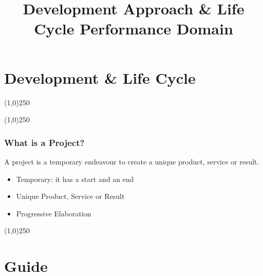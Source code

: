 



%
\title[Project Management \& BIM]{Development Approach \& Life Cycle Performance Domain}



%
\usetikzlibrary{arrows}



\newpage




\thispagestyle{empty}
\tableofcontents
\newpage
\section{Development \& Life Cycle}


\begin{frame}
\titlepage
\end{frame}\begin{center}\line(1,0){250}\end{center}
%
%
\begin{center}\line(1,0){250}\end{center}



\begin{frame}
\frametitle{What is a Project?}
A project is a temporary endeavour to create a unique product, service or result.\\
\begin{itemize}
\item Temporary: it has a start and an end
\item Unique Product, Service or Result
\item Progressive Elaboration
\end{itemize}
\end{frame}
\begin{center}\line(1,0){250}\end{center}









\section{Guide}

